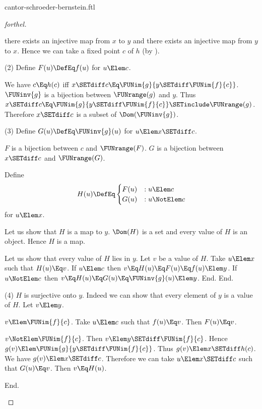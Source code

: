 \documentclass{stex}
\begin{document}
\begin{smodule}{cantor-schroeder-bernstein.ftl}
\begin{proof}[forthel]
\begin{case}{there exists an injective map from $x$ to $y$ and there exists an injective map from $y$ to $x$.}
    Hence we can take a fixed point $c$ of $h$ (by ).

    (2) Define $F(u) \DefEq f(u)$ for $u \Elem c$.

    We have $c \Eq h(c)$ iff $x \SETdiff c \Eq \FUNim{g}{y \SETdiff \FUNim{f}{c}}$.
    $\FUNinv{g}$ is a bijection between $\FUNrange(g)$ and $y$.
    Thus $x \SETdiff c \Eq \FUNim{g}{y \SETdiff \FUNim{f}{c}} \SETinclude \FUNrange(g)$.
    Therefore $x \SETdiff c$ is a subset of $\Dom(\FUNinv{g})$.

    (3) Define $G(u) \DefEq \FUNinv{g}(u)$ for $u \Elem x \SETdiff c$.

    $F$ is a bijection between $c$ and $\FUNrange(F)$.
    $G$ is a bijection between $x \SETdiff c$ and $\FUNrange(G)$.

    Define \[ H(u) \DefEq
      \begin{cases}
        F(u) & : u \Elem c \\
        G(u) & : u \NotElem c
      \end{cases} \]
    for $u \Elem x$.

    Let us show that $H$ is a map to $y$.
      $\Dom(H)$ is a set and every value of $H$ is an object.
      Hence $H$ is a map.

      Let us show that every value of $H$ lies in $y$.
        Let $v$ be a value of $H$.
        Take $u \Elem x$ such that $H(u) \Eq v$.
        If $u \Elem c$ then $v \Eq H(u) \Eq F(u) \Eq f(u) \Elem y$.
        If $u \NotElem c$ then $v \Eq H(u) \Eq G(u) \Eq \FUNinv{g}(u) \Elem y$.
      End.
    End.

    (4) $H$ is surjective onto $y$.
    Indeed we can show that every element of $y$ is a value of $H$.
      Let $v \Elem y$.

      \begin{case}{$v \Elem \FUNim{f}{c}$.}
        Take $u \Elem c$ such that $f(u) \Eq v$.
        Then $F(u) \Eq v$.
      \end{case}

      \begin{case}{$v \NotElem \FUNim{f}{c}$.}
        Then $v \Elem y \SETdiff \FUNim{f}{c}$.
        Hence $g(v) \Elem \FUNim{g}{y \SETdiff \FUNim{f}{c}}$.
        Thus $g(v) \Elem\linebreak x \SETdiff h(c)$.
        We have $g(v) \Elem x \SETdiff c$.
        Therefore we can take $u \Elem x \SETdiff c$ such that $G(u) \Eq v$.
        Then $v \Eq H(u)$.
      \end{case}
    End.


\end{case}
\end{proof}
\end{smodule}
\end{document}
